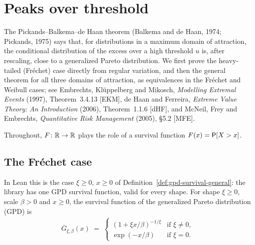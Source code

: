 \chapter{Peaks over threshold}

The Pickands--Balkema--de Haan theorem (Balkema and de Haan, 1974; Pickands, 1975) says
that, for distributions in a maximum domain of attraction, the conditional distribution of
the excess over a high threshold $u$ is, after rescaling, close to a generalized Pareto
distribution. We first prove the heavy-tailed (Fréchet) case directly from regular variation,
and then the general theorem for all three domains of attraction, as equivalences in the
Fréchet and Weibull cases; see Embrechts, Klüppelberg and Mikosch, \emph{Modelling Extremal
Events} (1997), Theorem~3.4.13 [EKM], de Haan and Ferreira, \emph{Extreme Value Theory: An
Introduction} (2006), Theorem~1.1.6 [dHF], and McNeil, Frey and Embrechts, \emph{Quantitative
Risk Management} (2005), \S5.2 [MFE].

Throughout, $F \colon \mathbb{R} \to \mathbb{R}$ plays the role of a survival function
$F(x) = \mathsf{P}[X > x]$.

\section{The Fréchet case}

\begin{definition}
  \label{def:gpd-survival}
  \leanok
  In Lean this is the case $\xi \ge 0$, $x \ge 0$ of Definition~\ref{def:gpd-survival-general}: the
  library has one GPD survival function, valid for every shape.
  For shape $\xi \ge 0$, scale $\beta > 0$ and $x \ge 0$, the survival function of the
  generalized Pareto distribution (GPD) is
  \begin{align*}
    \overline{G}_{\xi,\beta}(x) \; = \;
    \begin{cases}
      (1 + \xi x / \beta)^{-1/\xi} & \text{if } \xi \ne 0, \\
      \exp(-x/\beta) & \text{if } \xi = 0 .
    \end{cases}
  \end{align*}
\end{definition}

